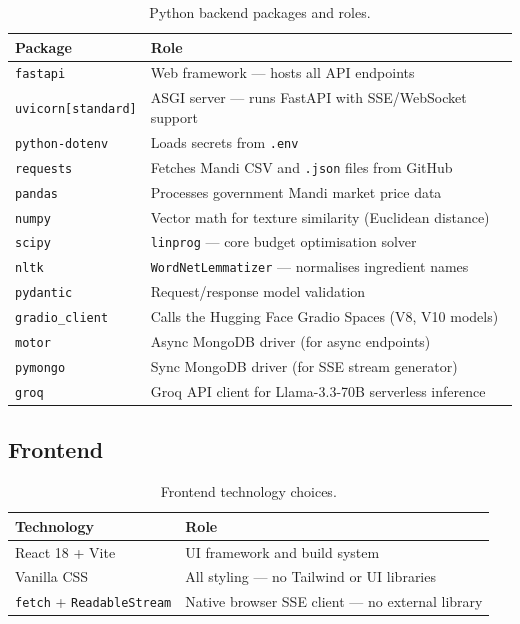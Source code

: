 \documentclass[12pt, a4paper]{article}
\begin{document}
\begin{table}[H]
\centering
\caption{Python backend packages and roles.}
\label{tab:backend}
\begin{tabularx}{\textwidth}{l X}
\toprule
\textbf{Package} & \textbf{Role} \\
\midrule
\texttt{fastapi}          & Web framework --- hosts all API endpoints \\
\texttt{uvicorn[standard]}& ASGI server --- runs FastAPI with SSE/WebSocket support \\
\texttt{python-dotenv}    & Loads secrets from \texttt{.env} \\
\texttt{requests}         & Fetches Mandi CSV and \texttt{.json} files from GitHub \\
\texttt{pandas}           & Processes government Mandi market price data \\
\texttt{numpy}            & Vector math for texture similarity (Euclidean distance) \\
\texttt{scipy}            & \texttt{linprog} --- core budget optimisation solver \\
\texttt{nltk}             & \texttt{WordNetLemmatizer} --- normalises ingredient names \\
\texttt{pydantic}         & Request/response model validation \\
\texttt{gradio\_client}   & Calls the Hugging Face Gradio Spaces (V8, V10 models) \\
\texttt{motor}            & Async MongoDB driver (for async endpoints) \\
\texttt{pymongo}          & Sync MongoDB driver (for SSE stream generator) \\
\texttt{groq}             & Groq API client for Llama-3.3-70B serverless inference \\
\bottomrule
\end{tabularx}
\end{table}

\subsection{Frontend}

\begin{table}[H]
\centering
\caption{Frontend technology choices.}
\label{tab:frontend}
\begin{tabularx}{\textwidth}{l X}
\toprule
\textbf{Technology} & \textbf{Role} \\
\midrule
React 18 + Vite       & UI framework and build system \\
Vanilla CSS           & All styling --- no Tailwind or UI libraries \\
\texttt{fetch} + \texttt{ReadableStream} & Native browser SSE client --- no external library \\
\bottomrule
\end{tabularx}
\end{table}
\end{document}
